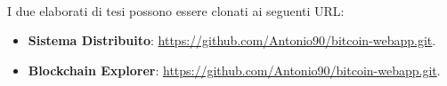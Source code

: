\\I due elaborati di tesi possono essere clonati ai seguenti URL:
\begin{itemize}
\item \textbf{Sistema Distribuito}: \href{https://github.com/Antonio90/bitcoin-webapp.git}{https://github.com/Antonio90/bitcoin-webapp.git}.
\item \textbf{Blockchain Explorer}: \href{https://github.com/Antonio90/bitcoin-webapp.git}{https://github.com/Antonio90/bitcoin-webapp.git}. 
\end{itemize}